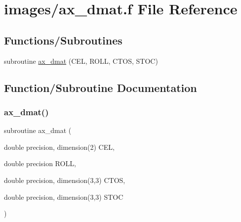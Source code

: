 \hypertarget{ax__dmat_8f}{}\section{images/ax\+\_\+dmat.f File Reference}
\label{ax__dmat_8f}
\subsection*{Functions/\+Subroutines}
\begin{DoxyCompactItemize}
\item 
subroutine \hyperlink{ax__dmat_8f_a99cab82e970e4b61b76bc5fc1a452e83}{ax\+\_\+dmat} (C\+EL, R\+O\+LL, C\+T\+OS, S\+T\+OC)
\end{DoxyCompactItemize}


\subsection{Function/\+Subroutine Documentation}
\mbox{\label{ax__dmat_8f_a99cab82e970e4b61b76bc5fc1a452e83}} 
\subsubsection{\texorpdfstring{ax\+\_\+dmat()}{ax\_dmat()}}
{\footnotesize\ttfamily subroutine ax\+\_\+dmat (\begin{DoxyParamCaption}\item[{double precision, dimension(2)}]{C\+EL,  }\item[{double precision}]{R\+O\+LL,  }\item[{double precision, dimension(3,3)}]{C\+T\+OS,  }\item[{double precision, dimension(3,3)}]{S\+T\+OC }\end{DoxyParamCaption})}


